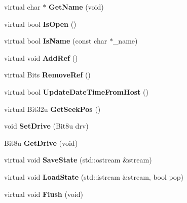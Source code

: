 \begin{DoxyCompactItemize}
\item 
\hypertarget{classDOS__File_abb4d2689b5d03d77421389629db0e1fb}{virtual char $\ast$ {\bfseries Get\-Name} (void)}\label{classDOS__File_abb4d2689b5d03d77421389629db0e1fb}

\item 
\hypertarget{classDOS__File_aa69aac124647f1ee095f165ce2bbee5b}{virtual bool {\bfseries Is\-Open} ()}\label{classDOS__File_aa69aac124647f1ee095f165ce2bbee5b}

\item 
\hypertarget{classDOS__File_ac072a4f064cb40e53291e8b7ef65c628}{virtual bool {\bfseries Is\-Name} (const char $\ast$\-\_\-name)}\label{classDOS__File_ac072a4f064cb40e53291e8b7ef65c628}

\item 
\hypertarget{classDOS__File_af518157a13945e5c73e0152add3490c8}{virtual void {\bfseries Add\-Ref} ()}\label{classDOS__File_af518157a13945e5c73e0152add3490c8}

\item 
\hypertarget{classDOS__File_a435afa3450fd4c75665f8a13ff03fb9d}{virtual Bits {\bfseries Remove\-Ref} ()}\label{classDOS__File_a435afa3450fd4c75665f8a13ff03fb9d}

\item 
\hypertarget{classDOS__File_a3e45ea4f759d34abfb4f696ee9225fae}{virtual bool {\bfseries Update\-Date\-Time\-From\-Host} ()}\label{classDOS__File_a3e45ea4f759d34abfb4f696ee9225fae}

\item 
\hypertarget{classDOS__File_a9473cbf5f0b6b3fabeeaf4c7c98f9cec}{virtual Bit32u {\bfseries Get\-Seek\-Pos} ()}\label{classDOS__File_a9473cbf5f0b6b3fabeeaf4c7c98f9cec}

\item 
\hypertarget{classDOS__File_a1874a25ea3a55075fc87c324a0f4d9b9}{void {\bfseries Set\-Drive} (Bit8u drv)}\label{classDOS__File_a1874a25ea3a55075fc87c324a0f4d9b9}

\item 
\hypertarget{classDOS__File_af4d98d880115f37ba0b3ff6e95bbaf55}{Bit8u {\bfseries Get\-Drive} (void)}\label{classDOS__File_af4d98d880115f37ba0b3ff6e95bbaf55}

\item 
\hypertarget{classDOS__File_ac2a385b26fd590639ffc9ebbbd62fdba}{virtual void {\bfseries Save\-State} (std\-::ostream \&stream)}\label{classDOS__File_ac2a385b26fd590639ffc9ebbbd62fdba}

\item 
\hypertarget{classDOS__File_ac8c307bd4f2ca8faa084fb66c70422cc}{virtual void {\bfseries Load\-State} (std\-::istream \&stream, bool pop)}\label{classDOS__File_ac8c307bd4f2ca8faa084fb66c70422cc}

\item 
\hypertarget{classDOS__File_a3a3d4b0eff671faf6e30b6af65b2054c}{virtual void {\bfseries Flush} (void)}\label{classDOS__File_a3a3d4b0eff671faf6e30b6af65b2054c}

\end{DoxyCompactItemize}
